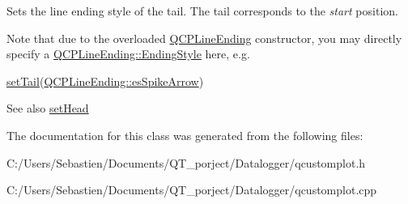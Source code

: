Sets the line ending style of the tail. The tail corresponds to the {\itshape start} position.

Note that due to the overloaded \hyperlink{class_q_c_p_line_ending}{Q\+C\+P\+Line\+Ending} constructor, you may directly specify a \hyperlink{class_q_c_p_line_ending_a5ef16e6876b4b74959c7261d8d4c2cd5}{Q\+C\+P\+Line\+Ending\+::\+Ending\+Style} here, e.\+g.
\begin{DoxyCode}
\hyperlink{class_q_c_p_item_curve_ac3488d8b1a6489c845dc5bff3ef71124}{setTail}(\hyperlink{class_q_c_p_line_ending_a5ef16e6876b4b74959c7261d8d4c2cd5ab9964d0d03f812d1e79de15edbeb2cbf}{QCPLineEnding::esSpikeArrow}) 
\end{DoxyCode}


\begin{DoxySeeAlso}{See also}
\hyperlink{class_q_c_p_item_curve_a08a30d9cdd63995deea3d9e20430676f}{set\+Head} 
\end{DoxySeeAlso}


The documentation for this class was generated from the following files\+:\begin{DoxyCompactItemize}
\item 
C\+:/\+Users/\+Sebastien/\+Documents/\+Q\+T\+\_\+porject/\+Datalogger/qcustomplot.\+h\item 
C\+:/\+Users/\+Sebastien/\+Documents/\+Q\+T\+\_\+porject/\+Datalogger/qcustomplot.\+cpp\end{DoxyCompactItemize}
